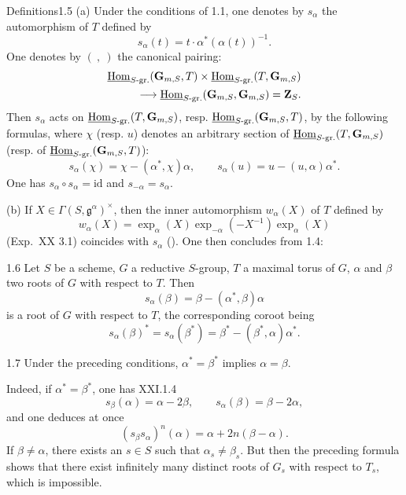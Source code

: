 \begin{enoncerm}{Definitions}{1.5}\label{XXII.1.5}
(a) Under the conditions of 1.1, one denotes by $s_\alpha$ the automorphism of $T$ defined by
\[
s_\alpha(t)=t\cdot\alpha^*(\alpha(t))^{-1}.
\]
One denotes by $(\ ,\ )$ the canonical pairing:
\[
\begin{split}
\underline{\operatorname{Hom}}_{S\text{-gr.}}(\mathbf G_{m,S},T)\times\underline{\operatorname{Hom}}_{S\text{-gr.}}(T,\mathbf G_{m,S})\\
\longrightarrow\underline{\operatorname{Hom}}_{S\text{-gr.}}(\mathbf G_{m,S},\mathbf G_{m,S})=\mathbf{Z}_S.
\end{split}
\]
Then $s_\alpha$ acts on $\underline{\operatorname{Hom}}_{S\text{-gr.}}(T,\mathbf G_{m,S})$, resp. $\underline{\operatorname{Hom}}_{S\text{-gr.}}(\mathbf G_{m,S},T)$, by the following formulas, where $\chi$ (resp. $u$) denotes an arbitrary section of $\underline{\operatorname{Hom}}_{S\text{-gr.}}(T,\mathbf G_{m,S})$ (resp. of $\underline{\operatorname{Hom}}_{S\text{-gr.}}(\mathbf G_{m,S},T)$):
\[
s_\alpha(\chi)=\chi-(\alpha^*,\chi)\alpha,\qquad
s_\alpha(u)=u-(u,\alpha)\alpha^*.
\]
One has $s_\alpha\circ s_\alpha=\mathrm{id}$ and $s_{-\alpha}=s_\alpha$.

(b) If $X\in\Gamma(S,\mathfrak g^\alpha)^\times$, then the inner automorphism $w_\alpha(X)$ of $T$ defined by
\[
w_\alpha(X)=\exp_\alpha(X)\exp_{-\alpha}(-X^{-1})\exp_\alpha(X)
\]
(\cf Exp.~XX 3.1) coincides with $s_\alpha$ (\loccit). One then concludes from 1.4:
\end{enoncerm}
\begin{corollary}{1.6}\label{XXII.1.6}
Let $S$ be a scheme, $G$ a reductive $S$-group, $T$ a maximal torus of $G$, $\alpha$ and $\beta$ two roots of $G$ with respect to $T$. Then
\[
s_\alpha(\beta)=\beta-(\alpha^*,\beta)\alpha
\]
is a root of $G$ with respect to $T$, the corresponding coroot being
\[
s_\alpha(\beta)^*=s_\alpha(\beta^*)=\beta^*-(\beta^*,\alpha)\alpha^*.
\]
\end{corollary}
\begin{corollary}{1.7}\label{XXII.1.7}
Under the preceding conditions, $\alpha^*=\beta^*$ implies $\alpha=\beta$.
\end{corollary}
Indeed, if $\alpha^*=\beta^*$, one has \cf XXI.1.4
\[
s_\beta(\alpha)=\alpha-2\beta,\qquad s_\alpha(\beta)=\beta-2\alpha,
\]
and one deduces at once
\[
(s_\beta s_\alpha)^n(\alpha)=\alpha+2n(\beta-\alpha).
\]
If $\beta\ne\alpha$, there exists an $s\in S$ such that $\alpha_s\ne\beta_s$. But then the preceding formula shows that there exist infinitely many distinct roots of $G_s$ with respect to $T_s$, which is impossible.

